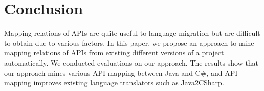 \section{Conclusion}
\label{sec:colcusion} Mapping relations of APIs are quite useful to
language migration but are difficult to obtain due to various
factors. In this paper, we propose an approach to mine mapping
relations of APIs from existing different versions of a project
automatically. We conducted evaluations on our approach. The results
show that our approach mines various API mapping between Java and
C\#, and API mapping improves existing language translators such as
Java2CSharp.
